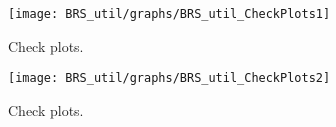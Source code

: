  
\begin{figure}[H]
\centering 
\texttt{[image: BRS\_util/graphs/BRS\_util\_CheckPlots1]}
\caption{Check plots.}\label{Fig:CheckPlots:1}
\end{figure}
 
\begin{figure}[H]
\centering 
\texttt{[image: BRS\_util/graphs/BRS\_util\_CheckPlots2]}
\caption{Check plots.}\label{Fig:CheckPlots:2}
\end{figure}
 
